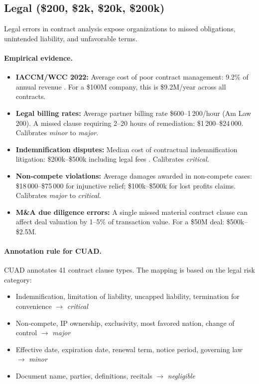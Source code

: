 \subsection{Legal (\$200, \$2k, \$20k, \$200k)}

Legal errors in contract analysis expose organizations to missed
obligations, unintended liability, and unfavorable terms.

\paragraph{Empirical evidence.}
\begin{itemize}
\item \textbf{IACCM/WCC 2022:} Average cost of poor contract management:
    9.2\% of annual revenue \citep{iaccm2022}. For a \$100M company,
    this is \$9.2M/year across all contracts.
\item \textbf{Legal billing rates:} Average partner billing rate
    \$600--1\,200/hour (Am Law 200). A missed clause requiring
    2--20 hours of remediation: \$1\,200--\$24\,000.
    Calibrates \textit{minor} to \textit{major}.
\item \textbf{Indemnification disputes:} Median cost of contractual
    indemnification litigation: \$200k--\$500k including legal fees
    \citep{aba2021indemnification}. Calibrates \textit{critical}.
\item \textbf{Non-compete violations:} Average damages awarded in
    non-compete cases: \$18\,000--\$75\,000 for injunctive relief;
    \$100k--\$500k for lost profits claims. Calibrates
    \textit{major} to \textit{critical}.
\item \textbf{M\&A due diligence errors:} A single missed material
    contract clause can affect deal valuation by 1--5\% of
    transaction value. For a \$50M deal: \$500k--\$2.5M.
\end{itemize}

\paragraph{Annotation rule for CUAD.}
CUAD annotates 41 contract clause types. The mapping is based on the
legal risk category:
\begin{itemize}
\item Indemnification, limitation of liability, uncapped liability,
    termination for convenience $\to$ \textit{critical}
\item Non-compete, IP ownership, exclusivity, most favored nation,
    change of control $\to$ \textit{major}
\item Effective date, expiration date, renewal term, notice period,
    governing law $\to$ \textit{minor}
\item Document name, parties, definitions, recitals $\to$
    \textit{negligible}
\end{itemize}


